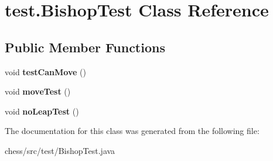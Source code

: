 \hypertarget{classtest_1_1_bishop_test}{}\section{test.\+Bishop\+Test Class Reference}
\label{classtest_1_1_bishop_test}
\subsection*{Public Member Functions}
\begin{DoxyCompactItemize}
\item 
\mbox{\label{classtest_1_1_bishop_test_af96c2c7142bd12e30cdced3d96902db2}} 
void {\bfseries test\+Can\+Move} ()
\item 
\mbox{\label{classtest_1_1_bishop_test_abd1635ec280f80dab4452eb97bd40368}} 
void {\bfseries move\+Test} ()
\item 
\mbox{\label{classtest_1_1_bishop_test_a3922491b5f889a81a5da540b64f27eee}} 
void {\bfseries no\+Leap\+Test} ()
\end{DoxyCompactItemize}


The documentation for this class was generated from the following file\+:\begin{DoxyCompactItemize}
\item 
chess/src/test/Bishop\+Test.\+java\end{DoxyCompactItemize}
